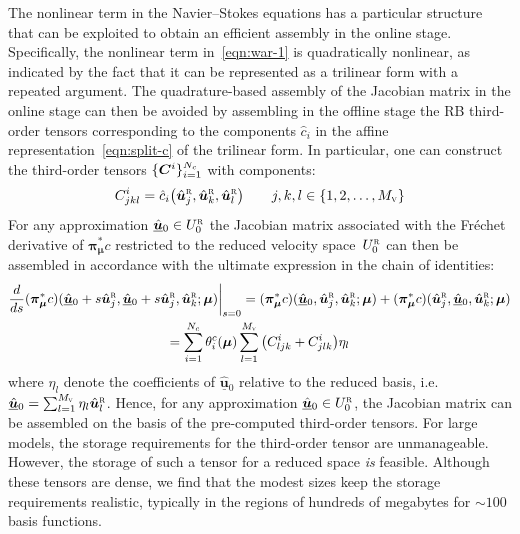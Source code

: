 \documentclass[onecolumn, twoside, a4paper, 11pt]{article}
\begin{document}
The nonlinear term in the Navier--Stokes equations has a particular structure that can be exploited to obtain an efficient assembly in the online stage. Specifically, the nonlinear term in~\eqref{eqn:war-1} is quadratically nonlinear, as indicated by the fact that it can be represented as a trilinear form with a repeated argument. The
quadrature-based assembly of the Jacobian matrix in the online stage can then be avoided by assembling in the
offline stage the RB third-order tensors corresponding to the components $\hat{c}_i$ in the affine representation~\eqref{eqn:split-c} of the trilinear form.
In particular, one can construct the third-order tensors $\smash[t]{\{{\bm C}^i\}_{i=1}^{N_c}}$ with components:
%
\begin{equation}
  C^i_{jkl} = \hat{c}{}_i\big(\hat{\bm u}^\textsc{r}_j, \hat{\bm u}^\textsc{r}_k, \hat{\bm u}^\textsc{r}_l\big)
  \qquad
  j,k,l\in\{1,2,\ldots,M_{\textsc{v}}\}
  \label{eqn:tensor}
\end{equation}
%
For any approximation $\underline{\hat{\bm u}}{}_0\in{}U_0^{\textsc{r}}$ the Jacobian matrix associated with the
Fr\'echet derivative of $\bm\pi_{\bm\mu}^* c$ restricted to the reduced velocity space~$U_0^{\textsc{r}}$ can then be assembled in accordance with the ultimate expression in the chain of identities:
%
\begin{multline}
\frac{d}{ds}(\bm\pi_{\bm\mu}^* c)(\underline{\hat{\bm u}}{}_0+s\hat{\bm u}^\textsc{r}_j,\underline{\hat{\bm u}}{}_0+s\hat{\bm u}^\textsc{r}_j,\hat{\bm u}^\textsc{r}_k;\bm \mu)\bigg|_{s=0}
=
(\bm\pi_{\bm\mu}^* c)(\underline{\hat{\bm u}}{}_0,\hat{\bm u}^\textsc{r}_j,\hat{\bm u}^\textsc{r}_k;\bm \mu)
+
(\bm\pi_{\bm\mu}^* c)(\hat{\bm u}^\textsc{r}_j,\underline{\hat{\bm u}}{}_0,\hat{\bm u}^\textsc{r}_k;\bm \mu)
\\
=
\sum_{i=1}^{N_c}\theta^c_i(\bm\mu)
\sum_{l=1}^{M_{\textsc{v}}}
\big(C^i_{ljk}+C^i_{jlk}\big)\eta_l
\end{multline}
%
where $\eta_l$ denote the coefficients of $\underline{\hat{\bm u}}{}_0$ relative to the reduced basis, i.e.
$\underline{\hat{\bm u}}{}_0=\sum_{l=1}^{M_{\textsc{v}}}\eta_l\hat{\bm u}^\textsc{r}_l$. Hence, for any
approximation $\underline{\hat{\bm u}}{}_0\in{}U^{\textsc{r}}_0$, the Jacobian matrix can be assembled on the
basis of the pre-computed third-order tensors. For large models, the storage requirements for the third-order
tensor are unmanageable. However, the storage of such a tensor for a reduced space {\em is\/} feasible.
Although these tensors are dense, we find that the modest sizes keep the storage requirements realistic,
typically in the regions of hundreds of megabytes for ${\sim}100$ basis
functions.
\end{document}
